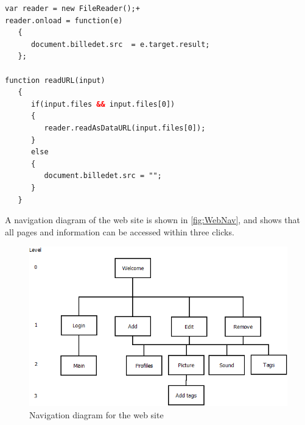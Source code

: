 \begin{lstlisting}[language=HTML,label=code:myHack,caption=Hack to load file from \code{file} box]
var reader = new FileReader();+
reader.onload = function(e) 
   {
      document.billedet.src  = e.target.result;
   };

function readURL(input)
   {
      if(input.files && input.files[0])
      {
         reader.readAsDataURL(input.files[0]);
      }
      else 
      {
         document.billedet.src = "";
      }
   }
\end{lstlisting}

A navigation diagram of the web site is shown in \autoref{fig:WebNav}, and shows that all pages and information can be accessed within three clicks.

\begin{figure}
	\centering
		\includegraphics[width=1.00\textwidth]{images/WebNav.png}
	\caption{Navigation diagram for the web site}
	\label{fig:WebNav}
\end{figure}

